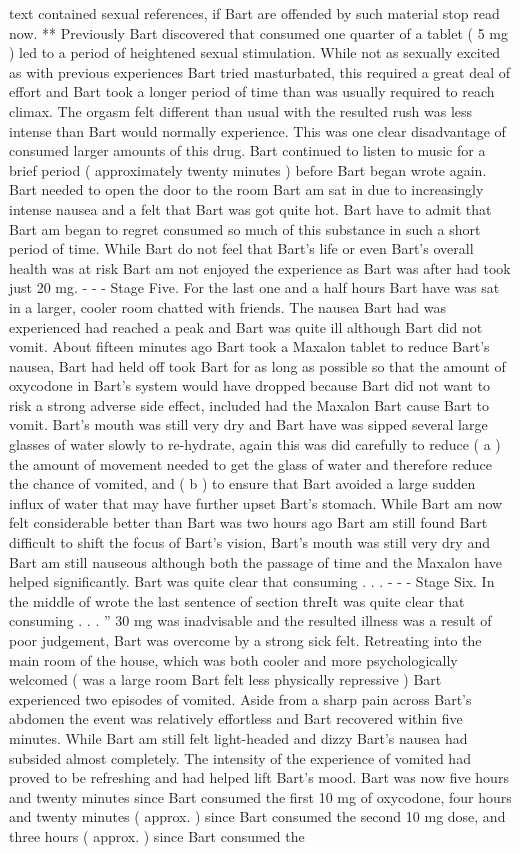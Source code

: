 \documentclass[12pt]{book}
\begin{document}
text contained sexual references, if Bart are offended by such material stop read now. ** Previously Bart discovered that consumed one quarter of a tablet ( 5 mg ) led to a period of heightened sexual stimulation. While not as sexually excited as with previous experiences Bart tried masturbated, this required a great deal of effort and Bart took a longer period of time than was usually required to reach climax. The orgasm felt different than usual with the resulted rush was less intense than Bart would normally experience. This was one clear disadvantage of consumed larger amounts of this drug. Bart continued to listen to music for a brief period ( approximately twenty minutes ) before Bart began wrote again. Bart needed to open the door to the room Bart am sat in due to increasingly intense nausea and a felt that Bart was got quite hot. Bart have to admit that Bart am began to regret consumed so much of this substance in such a short period of time. While Bart do not feel that Bart's life or even Bart's overall health was at risk Bart am not enjoyed the experience as Bart was after had took just 20 mg. - - - Stage Five. For the last one and a half hours Bart have was sat in a larger, cooler room chatted with friends. The nausea Bart had was experienced had reached a peak and Bart was quite ill although Bart did not vomit. About fifteen minutes ago Bart took a Maxalon tablet to reduce Bart's nausea, Bart had held off took Bart for as long as possible so that the amount of oxycodone in Bart's system would have dropped because Bart did not want to risk a strong adverse side effect, included had the Maxalon Bart cause Bart to vomit. Bart's mouth was still very dry and Bart have was sipped several large glasses of water slowly to re-hydrate, again this was did carefully to reduce ( a ) the amount of movement needed to get the glass of water and therefore reduce the chance of vomited, and ( b ) to ensure that Bart avoided a large sudden influx of water that may have further upset Bart's stomach. While Bart am now felt considerable better than Bart was two hours ago Bart am still found Bart difficult to shift the focus of Bart's vision, Bart's mouth was still very dry and Bart am still nauseous although both the passage of time and the Maxalon have helped significantly. Bart was quite clear that consuming . . .  - - - Stage Six. In the middle of wrote the last sentence of section threIt was quite clear that consuming . . . '' 30 mg was inadvisable and the resulted illness was a result of poor judgement, Bart was overcome by a strong sick felt. Retreating into the main room of the house, which was both cooler and more psychologically welcomed ( was a large room Bart felt less physically repressive ) Bart experienced two episodes of vomited. Aside from a sharp pain across Bart's abdomen the event was relatively effortless and Bart recovered within five minutes. While Bart am still felt light-headed and dizzy Bart's nausea had subsided almost completely. The intensity of the experience of vomited had proved to be refreshing and had helped lift Bart's mood. Bart was now five hours and twenty minutes since Bart consumed the first 10 mg of oxycodone, four hours and twenty minutes ( approx. ) since Bart consumed the second 10 mg dose, and three hours ( approx. ) since Bart consumed the 
\end{document}
